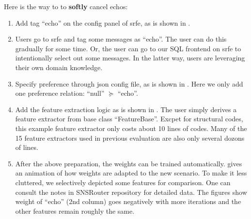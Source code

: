 \documentclass{sig-alternate}
\begin{document}
Here is the way to to {\bf softly} cancel echos:
\begin{enumerate}
	\item Add tag ``echo'' on the config panel of \gls{srfe}, 
		as is shown in \rfig{\ref{fig:echo_add_tag}}. 
	\item Users go to \gls{srfe} and tag some messages as ``echo''. 
		The user can do this gradually for some time. 
		Or, the user can go to our SQL frontend on \gls{srfe}
		to intentionally select out some messages. 
		In the latter way, users are leveraging their own domain knowledge. 
	\item Specify preference through json config file, 
		as is shown in \rfig{\ref{fig:echo_preference}}. 
		Here we only add one preference relation: ``null'' $\succeq$ ``echo''. 
	\item Add the feature extraction logic as is shown in \rfig{\ref{fig:echo_feature}}. 
		The user simply derives a feature extractor from base class ``FeatureBase''.
		Excpet for structural codes, this example feature extractor 
		only costs about 10 lines of codes.
		Many of the 15 feature extractors used in previous evaluation are also only several dozons of lines. 
	\item After the above preparation, 
		the weights can be trained automatically. 
		\rfig{\ref{fig:echo_train}} gives an animation of how 
		weights are adapted to the new scenario. 
		To make it less cluttered, we selectively depicted some features for comparison. 
		One can consult the notes in SNSRouter repository for detailed data. 
		The figures show weight of ``echo'' (2nd column) goes negatively
		with more iterations and the other features remain roughly the same. 
\end{enumerate}

%
%
\end{document}
